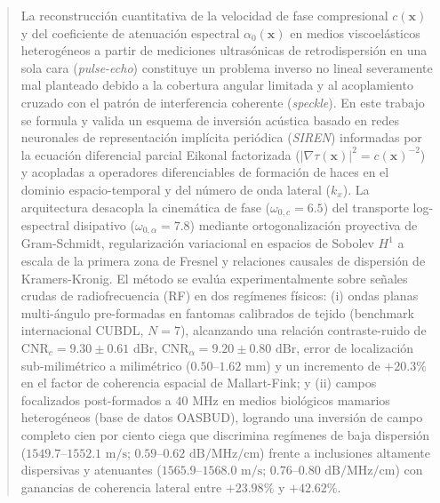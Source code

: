 \documentclass[9pt]{article}
\begin{document}
\begin{abstract}
\noindent La reconstrucción cuantitativa de la velocidad de fase compresional $c(\mathbf{x})$ y del coeficiente de atenuación espectral $\alpha_0(\mathbf{x})$ en medios viscoelásticos heterogéneos a partir de mediciones ultrasónicas de retrodispersión en una sola cara (\textit{pulse-echo}) constituye un problema inverso no lineal severamente mal planteado debido a la cobertura angular limitada y al acoplamiento cruzado con el patrón de interferencia coherente (\textit{speckle}). En este trabajo se formula y valida un esquema de inversión acústica basado en redes neuronales de representación implícita periódica (\textit{SIREN}) informadas por la ecuación diferencial parcial Eikonal factorizada ($\lvert\nabla\tau(\mathbf{x})\rvert^2 = c(\mathbf{x})^{-2}$) y acopladas a operadores diferenciables de formación de haces en el dominio espacio-temporal y del número de onda lateral ($k_x$). La arquitectura desacopla la cinemática de fase ($\omega_{0,c}=6.5$) del transporte log-espectral disipativo ($\omega_{0,\alpha}=7.8$) mediante ortogonalización proyectiva de Gram-Schmidt, regularización variacional en espacios de Sobolev $H^1$ a escala de la primera zona de Fresnel y relaciones causales de dispersión de Kramers-Kronig. El método se evalúa experimentalmente sobre señales crudas de radiofrecuencia (RF) en dos regímenes físicos: (i) ondas planas multi-ángulo pre-formadas en fantomas calibrados de tejido (benchmark internacional CUBDL, $N=7$), alcanzando una relación contraste-ruido de $\text{CNR}_c = 9.30 \pm 0.61\text{ dBr}$, $\text{CNR}_\alpha = 9.20 \pm 0.80\text{ dBr}$, error de localización sub-milimétrico a milimétrico ($0.50\text{--}1.62\text{ mm}$) y un incremento de $+20.3\%$ en el factor de coherencia espacial de Mallart-Fink; y (ii) campos focalizados post-formados a $40\text{ MHz}$ en medios biológicos mamarios heterogéneos (base de datos OASBUD), logrando una inversión de campo completo cien por ciento ciega que discrimina regímenes de baja dispersión ($1549.7\text{--}1552.1\text{ m/s}$; $0.59\text{--}0.62\text{ dB/MHz/cm}$) frente a inclusiones altamente dispersivas y atenuantes ($1565.9\text{--}1568.0\text{ m/s}$; $0.76\text{--}0.80\text{ dB/MHz/cm}$) con ganancias de coherencia lateral entre $+23.98\%$ y $+42.62\%$.
\end{abstract}
\end{document}
